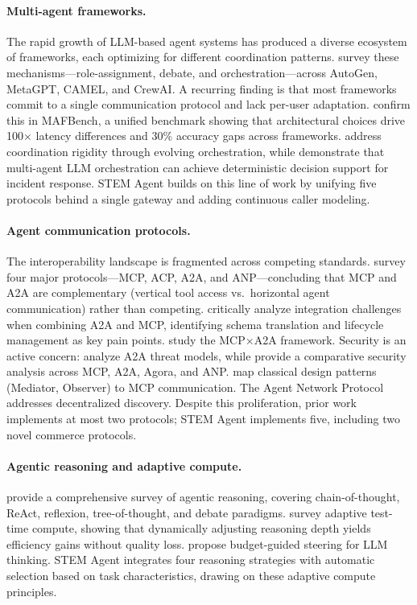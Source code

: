 \documentclass{article}
\begin{document}
\paragraph{Multi-agent frameworks.}
The rapid growth of LLM-based agent systems has produced a diverse ecosystem of frameworks, each optimizing for different coordination patterns. \citet{tran2025multiagent} survey these mechanisms---role-assignment, debate, and orchestration---across AutoGen, MetaGPT, CAMEL, and CrewAI. A recurring finding is that most frameworks commit to a single communication protocol and lack per-user adaptation. \citet{orogat2026mafbench} confirm this in MAFBench, a unified benchmark showing that architectural choices drive 100$\times$ latency differences and 30\% accuracy gaps across frameworks. \citet{dang2025evolving} address coordination rigidity through evolving orchestration, while \citet{drammeh2025orchestration} demonstrate that multi-agent LLM orchestration can achieve deterministic decision support for incident response. STEM Agent builds on this line of work by unifying five protocols behind a single gateway and adding continuous caller modeling.

\paragraph{Agent communication protocols.}
The interoperability landscape is fragmented across competing standards. \citet{ehtesham2025survey} survey four major protocols---MCP, ACP, A2A, and ANP---concluding that MCP and A2A are complementary (vertical tool access vs.\ horizontal agent communication) rather than competing. \citet{li2025gluetoprotocols} critically analyze integration challenges when combining A2A and MCP, identifying schema translation and lifecycle management as key pain points. \citet{jeong2025mcpa2a} study the MCP$\times$A2A framework. Security is an active concern: \citet{habler2025a2a} analyze A2A threat models, while \citet{anbiaee2026security} provide a comparative security analysis across MCP, A2A, Agora, and ANP. \citet{sarkar2025mcpsurvey} map classical design patterns (Mediator, Observer) to MCP communication. The Agent Network Protocol~\citep{chang2025anp} addresses decentralized discovery. Despite this proliferation, prior work implements at most two protocols; STEM Agent implements five, including two novel commerce protocols.

\paragraph{Agentic reasoning and adaptive compute.}
\citet{wei2026agentic} provide a comprehensive survey of agentic reasoning, covering chain-of-thought, ReAct, reflexion, tree-of-thought, and debate paradigms. \citet{alomrani2025reasoning} survey adaptive test-time compute, showing that dynamically adjusting reasoning depth yields efficiency gains without quality loss. \citet{li2025budget} propose budget-guided steering for LLM thinking. STEM Agent integrates four reasoning strategies with automatic selection based on task characteristics, drawing on these adaptive compute principles.
\end{document}
